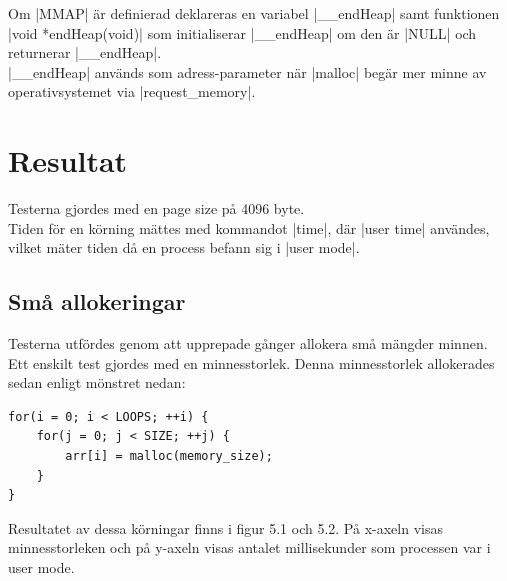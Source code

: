 \documentclass[paper=a4, fontsize=11pt]{scrartcl} %
\numberwithin{equation}{section} %
\numberwithin{figure}{section} %
\numberwithin{table}{section} %
\begin{document}
%
%
Om |MMAP| är definierad deklareras en variabel |__endHeap| samt funktionen 
|void *endHeap(void)| som initialiserar |__endHeap| om den är |NULL| och returnerar |__endHeap|.\\

|__endHeap| används som adress-parameter när |malloc| begär mer minne av operativsystemet via |request_memory|.




\section{Resultat}

Testerna gjordes med en page size på 4096 byte.\\
Tiden för en körning mättes med kommandot |time|, där |user time| användes, vilket mäter tiden då en process
befann sig i |user mode|.

\subsection{Små allokeringar}

Testerna utfördes genom att upprepade gånger allokera små mängder minnen.
Ett enskilt test gjordes med en minnesstorlek. Denna minnesstorlek allokerades sedan enligt mönstret nedan:

\begin{verbatim}
for(i = 0; i < LOOPS; ++i) {
    for(j = 0; j < SIZE; ++j) {
        arr[i] = malloc(memory_size);
    }
}
\end{verbatim}

Resultatet av dessa körningar finns i figur 5.1 och 5.2. På x-axeln visas minnesstorleken och på y-axeln visas antalet millisekunder som processen var i user mode.
\end{document}
